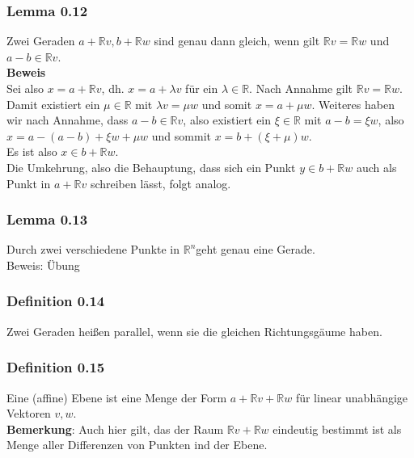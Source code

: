 \documentclass{scrartcl}
\newcommand{\lb}{\lambda}
\newcommand{\R}{\mathbb{R}}
\newcommand{\mRn}{\(\mathbb{R}^n\)}
\begin{document}
\subsubsection{Lemma 0.12}
Zwei Geraden \(a + \R v, b + \R w\) sind genau dann gleich, wenn gilt \(\R v = \R w\) und \(a - b \in \R v\).\\
\textbf{Beweis}\\
Sei also  \(x = a + \R v\), dh. \(x = a + \lb v\) f\"ur ein \(\lb \in \R\). Nach Annahme gilt \(\R v = \R w\). Damit existiert ein \(\mu \in \R\) mit \(\lb v = \mu w\) und somit \(x = a + \mu w\). Weiteres haben wir nach Annahme, dass \(a-b \in \R v\), also existiert ein \(\xi \in \R\) mit \(a - b = \xi w\), also \(x = a - (a - b) + \xi w + \mu w\) und sommit \(x = b + (\xi + \mu) w\).\\
Es ist also \(x \in b + \R w\).\\
Die Umkehrung, also die Behauptung, dass sich ein Punkt \(y \in b + \R w\) auch als Punkt in \(a + \R v\) schreiben l\"asst, folgt analog.\\

\subsubsection{Lemma 0.13}
Durch zwei verschiedene Punkte in \mRn geht genau eine Gerade.\\
Beweis: \"Ubung

\subsubsection{Definition 0.14}
Zwei Geraden hei\ss{}en parallel, wenn sie die gleichen Richtungsg\"aume haben.

\subsubsection{Definition 0.15}
Eine (affine) Ebene ist eine Menge der Form \(a + \R v + \R w\) f\"ur linear unabh\"angige Vektoren \(v, w\).\\
\textbf{Bemerkung}: Auch hier gilt, das der Raum \(\R v + \R w\) eindeutig bestimmt ist als Menge aller Differenzen von Punkten ind der Ebene.
\end{document}
